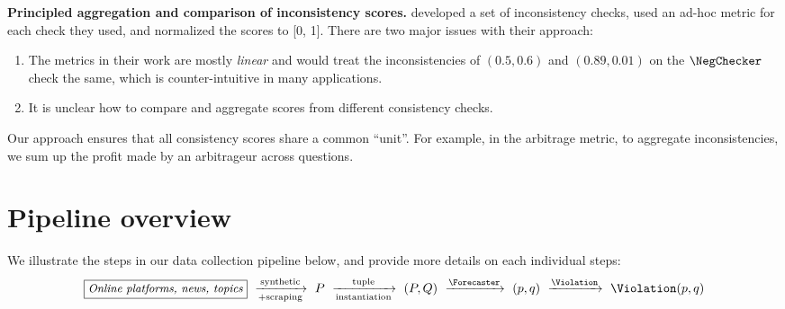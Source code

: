 \textbf{Principled aggregation and comparison of inconsistency scores.}
\cite{esmwcc} developed a set of inconsistency checks, used an ad-hoc metric for each check they used, and normalized the scores to [0, 1].
There are two major issues with their approach:
\begin{enumerate}
    \item The metrics in their work are mostly \emph{linear} and would treat the inconsistencies of $(0.5, 0.6)$ and $(0.89, 0.01)$ on the $\NegChecker$ check the same, which is counter-intuitive in many applications.
    \item It is unclear how to compare and aggregate scores from different consistency checks.
\end{enumerate}
Our approach ensures that all consistency scores share a common ``unit''. For example, in the arbitrage metric, to aggregate inconsistencies, we sum up the profit made by an arbitrageur across questions.


\section{Pipeline overview}
\label{cfc/sec:pipeline}

We illustrate the steps in our data collection pipeline below, and provide more details on each individual steps:
%
\begin{equation*}
    \fbox{\text{\small\emph{Online platforms, news, topics}}}\ \xrightarrow[\text{+scraping}]{\text{synthetic}}\ P\ \xrightarrow[\text{instantiation}]{\text{tuple}}\ (P,Q)\ \xrightarrow{\Forecaster}\ (p,q)\ \xrightarrow{\Violation}\ \Violation(p,q)
\end{equation*}

